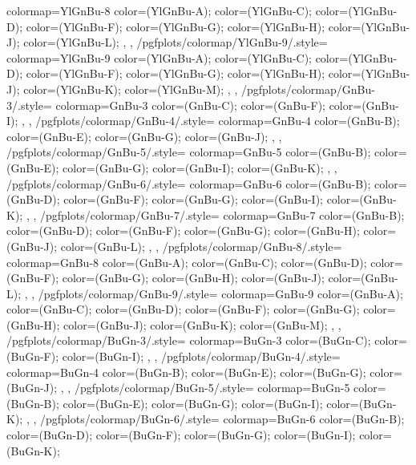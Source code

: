 {{    colormap={YlGnBu-8}{
      color=(YlGnBu-A);
      color=(YlGnBu-C);
      color=(YlGnBu-D);
      color=(YlGnBu-F);
      color=(YlGnBu-G);
      color=(YlGnBu-H);
      color=(YlGnBu-J);
      color=(YlGnBu-L);
    },
  },
  /pgfplots/colormap/YlGnBu-9/.style={
    colormap={YlGnBu-9}{
      color=(YlGnBu-A);
      color=(YlGnBu-C);
      color=(YlGnBu-D);
      color=(YlGnBu-F);
      color=(YlGnBu-G);
      color=(YlGnBu-H);
      color=(YlGnBu-J);
      color=(YlGnBu-K);
      color=(YlGnBu-M);
    },
  },
  /pgfplots/colormap/GnBu-3/.style={
    colormap={GnBu-3}{
      color=(GnBu-C);
      color=(GnBu-F);
      color=(GnBu-I);
    },
  },
  /pgfplots/colormap/GnBu-4/.style={
    colormap={GnBu-4}{
      color=(GnBu-B);
      color=(GnBu-E);
      color=(GnBu-G);
      color=(GnBu-J);
    },
  },
  /pgfplots/colormap/GnBu-5/.style={
    colormap={GnBu-5}{
      color=(GnBu-B);
      color=(GnBu-E);
      color=(GnBu-G);
      color=(GnBu-I);
      color=(GnBu-K);
    },
  },
  /pgfplots/colormap/GnBu-6/.style={
    colormap={GnBu-6}{
      color=(GnBu-B);
      color=(GnBu-D);
      color=(GnBu-F);
      color=(GnBu-G);
      color=(GnBu-I);
      color=(GnBu-K);
    },
  },
  /pgfplots/colormap/GnBu-7/.style={
    colormap={GnBu-7}{
      color=(GnBu-B);
      color=(GnBu-D);
      color=(GnBu-F);
      color=(GnBu-G);
      color=(GnBu-H);
      color=(GnBu-J);
      color=(GnBu-L);
    },
  },
  /pgfplots/colormap/GnBu-8/.style={
    colormap={GnBu-8}{
      color=(GnBu-A);
      color=(GnBu-C);
      color=(GnBu-D);
      color=(GnBu-F);
      color=(GnBu-G);
      color=(GnBu-H);
      color=(GnBu-J);
      color=(GnBu-L);
    },
  },
  /pgfplots/colormap/GnBu-9/.style={
    colormap={GnBu-9}{
      color=(GnBu-A);
      color=(GnBu-C);
      color=(GnBu-D);
      color=(GnBu-F);
      color=(GnBu-G);
      color=(GnBu-H);
      color=(GnBu-J);
      color=(GnBu-K);
      color=(GnBu-M);
    },
  },
  /pgfplots/colormap/BuGn-3/.style={
    colormap={BuGn-3}{
      color=(BuGn-C);
      color=(BuGn-F);
      color=(BuGn-I);
    },
  },
  /pgfplots/colormap/BuGn-4/.style={
    colormap={BuGn-4}{
      color=(BuGn-B);
      color=(BuGn-E);
      color=(BuGn-G);
      color=(BuGn-J);
    },
  },
  /pgfplots/colormap/BuGn-5/.style={
    colormap={BuGn-5}{
      color=(BuGn-B);
      color=(BuGn-E);
      color=(BuGn-G);
      color=(BuGn-I);
      color=(BuGn-K);
    },
  },
  /pgfplots/colormap/BuGn-6/.style={
    colormap={BuGn-6}{
      color=(BuGn-B);
      color=(BuGn-D);
      color=(BuGn-F);
      color=(BuGn-G);
      color=(BuGn-I);
      color=(BuGn-K);
}}}

